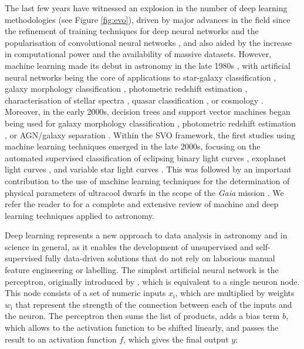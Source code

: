 The last few years have witnessed an explosion in the number of deep learning methodologies (see Figure \ref{fig:evo}), driven by major advances in the field since the refinement of training techniques for deep neural networks \citep{bengio2006,hinton2006a,hinton2006b} and the popularisation of convolutional neural networks \citep{alexnet2012,vggnet2014}, and also aided by the increase in computational power and the availability of massive datasets. However, machine learning made its debut in astronomy in the late 1980s \citep[see][and references therein]{miller1993}, with artificial neural networks being the core of applications to star-galaxy classification \citep{odewahn1992,odewahn1993,bertin1996,bazell1998,anderson2000,qin2003}, galaxy morphology classification \citep{storrie1992,lahav1995,lahav1996,odewahn1996,cohen2003,madgwick2003}, photometric redshift estimation \citep{firth2003,tagliaferri2003,ball2004}, characterisation of stellar spectra \citep{klusch1993,hippel1994,bailer_jones1997}, quasar classification \citep{carballo2004,claeskens2006}, or cosmology \citep{auld2007,auld2008}. Moreover, in the early 2000s, decision trees and support vector machines began being used for galaxy morphology classification \citep{huertas2008,huertas2011}, photometric redshift estimation \citep{wadadekar2005}, or AGN/galaxy separation \citep{white2000,gao2008}. Within the SVO framework, the first studies using machine learning techniques emerged in the late 2000s, focusing on the automated supervised classification of eclipsing binary light curves \citep{sarro2006}, exoplanet light curves \citep{sarro2006b}, and variable star light curves \citep{debosscher2007,sarro2009}. This was followed by an important contribution to the use of machine learning techniques for the determination of physical parameters of ultracool dwarfs in the scope of the \textit{Gaia} mission \citep{sarro2013,bailerjones2013}. We refer the reader to \citet{ml_review_baron,ml_review_ball,huertas2023,smith2023} for a complete and extensive review of machine and deep learning techniques applied to astronomy.

Deep learning represents a new approach to data analysis in astronomy and in science in general, as it enables the development of unsupervised and self-supervised fully data-driven solutions that do not rely on laborious manual feature engineering or labelling. The simplest artificial neural network is the perceptron, originally introduced by \citep{rosenblatt1958}, which is equivalent to a single neuron node. This node consists of a set of numeric inputs $\textit{x}_{\mathrm{i}}$, which are multiplied by weights $\textit{w}_{\mathrm{i}}$ that represent the strength of the connection between each of the inputs and the neuron. The perceptron then sums the list of products, adds a bias term $\textit{b}$, which allows to the activation function to be shifted linearly, and passes the result to an activation function $\textit{f}$, which gives the final output $\textit{y}$:

